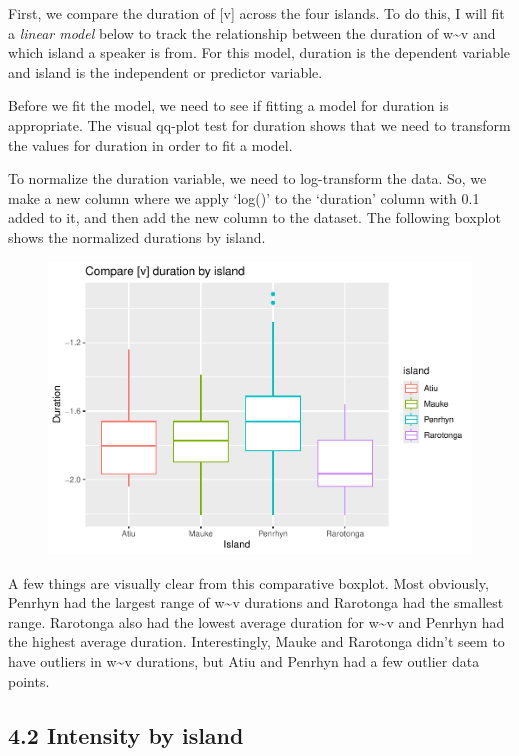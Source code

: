 \documentclass[
  ,man,floatsintext]{apa6}
\begin{document}
First, we compare the duration of {[}v{]} across the four islands. To do this, I will fit a \emph{linear model} below to track the relationship between the duration of w\textasciitilde v and which island a speaker is from. For this model, duration is the dependent variable and island is the independent or predictor variable.

Before we fit the model, we need to see if fitting a model for duration is appropriate. The visual qq-plot test for duration shows that we need to transform the values for duration in order to fit a model.

To normalize the duration variable, we need to log-transform the data. So, we make a new column where we apply `log()' to the `duration' column with 0.1 added to it, and then add the new column to the dataset. The following boxplot shows the normalized durations by island.

\begin{figure}
\includegraphics[width=0.75\linewidth]{cim_w_v_manuscript_files/figure-latex/print-mod1-1} \caption{ }\label{fig:print-mod1}
\end{figure}

A few things are visually clear from this comparative boxplot. Most obviously, Penrhyn had the largest range of w\textasciitilde v durations and Rarotonga had the smallest range. Rarotonga also had the lowest average duration for w\textasciitilde v and Penrhyn had the highest average duration. Interestingly, Mauke and Rarotonga didn't seem to have outliers in w\textasciitilde v durations, but Atiu and Penrhyn had a few outlier data points.

\subsection{4.2 Intensity by island}\label{intensity-by-island}
\end{document}
